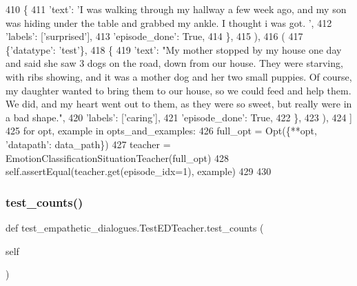 \begin{DoxyCode}
410                     \{
411                         \textcolor{stringliteral}{'text'}: \textcolor{stringliteral}{'I was walking through my hallway a few week ago, and my son was hiding
       under the table and grabbed my ankle. I thought i was got. '},
412                         \textcolor{stringliteral}{'labels'}: [\textcolor{stringliteral}{'surprised'}],
413                         \textcolor{stringliteral}{'episode\_done'}: \textcolor{keyword}{True},
414                     \},
415                 ),
416                 (
417                     \{\textcolor{stringliteral}{'datatype'}: \textcolor{stringliteral}{'test'}\},
418                     \{
419                         \textcolor{stringliteral}{'text'}: \textcolor{stringliteral}{"My mother stopped by my house one day and said she saw 3 dogs on the road,
       down from our house. They were starving, with ribs showing, and it was a mother dog and her two small
       puppies. Of course, my daughter wanted to bring them to our house, so we could feed and help them. We did, and my
       heart went out to them, as they were so sweet, but really were in a bad shape."},
420                         \textcolor{stringliteral}{'labels'}: [\textcolor{stringliteral}{'caring'}],
421                         \textcolor{stringliteral}{'episode\_done'}: \textcolor{keyword}{True},
422                     \},
423                 ),
424             ]
425             \textcolor{keywordflow}{for} opt, example \textcolor{keywordflow}{in} opts\_and\_examples:
426                 full\_opt = Opt(\{**opt, \textcolor{stringliteral}{'datapath'}: data\_path\})
427                 teacher = EmotionClassificationSituationTeacher(full\_opt)
428                 self.assertEqual(teacher.get(episode\_idx=1), example)
429 
430 
\end{DoxyCode}
\mbox{\label{classtest__empathetic__dialogues_1_1TestEDTeacher_a7c4ed6219d6095fca68c1140fe087d05}} 
\subsubsection{\texorpdfstring{test\+\_\+counts()}{test\_counts()}}
{\footnotesize\ttfamily def test\+\_\+empathetic\+\_\+dialogues.\+Test\+E\+D\+Teacher.\+test\+\_\+counts (\begin{DoxyParamCaption}\item[{}]{self }\end{DoxyParamCaption})}



